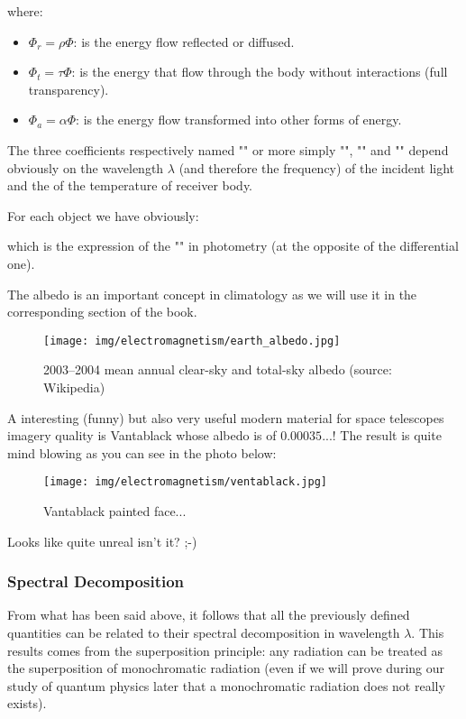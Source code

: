 	where:
	\begin{itemize}
		\item $\Phi_r=\rho\Phi$: is the energy flow reflected or diffused.

		\item $\Phi_t=\tau\Phi$: is the energy that flow through the body without interactions (full transparency).

		\item $\Phi_a=\alpha\Phi$: is the energy flow transformed into other forms of energy.
	\end{itemize}
	The three coefficients respectively named "" or more simply "", "" and "" depend obviously on the wavelength $\lambda$ (and therefore the frequency) of the incident light and the of the temperature of receiver body.
	
	For each object we have obviously:
	
	which is the expression of the "" in photometry (at the opposite of the differential one).
	
	The albedo is an important concept in climatology as we will use it in the corresponding section of the book.
	\begin{figure}[H]
		\centering
		\texttt{[image: img/electromagnetism/earth\_albedo.jpg]}
		\caption[2003–2004 mean annual clear-sky and total-sky albedo]{2003–2004 mean annual clear-sky and total-sky albedo (source: Wikipedia)}
	\end{figure}
	
	\pagebreak
	A interesting (funny) but also very useful modern material for space telescopes imagery quality is Vantablack whose albedo is of  $0.00035$...! The result is quite mind blowing as you can see in the photo below:
	\begin{figure}[H]
		\centering
		\texttt{[image: img/electromagnetism/ventablack.jpg]}
		\caption{Vantablack painted face...}
	\end{figure}
	Looks like quite unreal isn't it? ;-)
	
	\subsubsection{Spectral Decomposition}
	From what has been said above, it follows that all the previously defined quantities can be related to their spectral decomposition in wavelength $\lambda$. This results comes from the superposition principle: any radiation can be treated as the superposition of monochromatic radiation (even if we will prove during our study of quantum physics later that a monochromatic radiation does not really exists).
	
